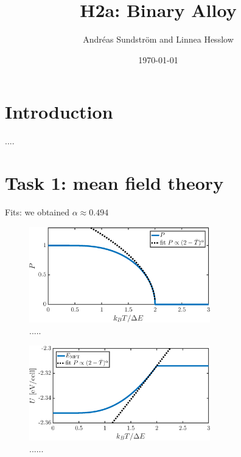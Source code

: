 
\usepackage{units}
\usepackage{physics}

\newcommand{\ee}{\mathrm{e}}
\newcommand{\ii}{\mathrm{i}}

\title{H2a: Binary Alloy}
\author{Andr\'eas Sundstr\"om and Linnea Hesslow}
\date{\today}





\section*{Introduction}

....

\section*{Task 1: mean field theory}
Fits: we obtained $\alpha \approx 0.494$

\begin{figure}[!ht]
\begin{center}
  \includegraphics[width=0.7\textwidth]{../figures/P_MFT} 
  \caption{.....}
  \label{fig1}
\end{center}
\end{figure}

\begin{figure}[!ht]
\begin{center}
  \includegraphics[width=0.7\textwidth]{../figures/E_MFT} 
  \caption{......}
  \label{fig1}
\end{center}
\end{figure}

